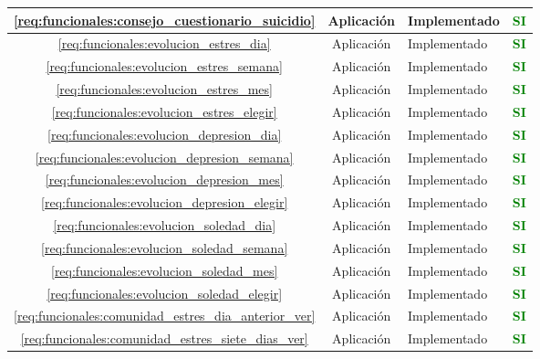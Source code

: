 \begin{xltabular}{\textwidth}{|c|c|X|c|}
        \hline
        \ref{req:funcionales:consejo_cuestionario_suicidio} & Aplicación & Implementado & \textcolor{green}{\textbf{SI}} \\
        \hline
        \ref{req:funcionales:evolucion_estres_dia} & Aplicación & Implementado & \textcolor{green}{\textbf{SI}} \\
        \hline
        \ref{req:funcionales:evolucion_estres_semana} & Aplicación & Implementado & \textcolor{green}{\textbf{SI}} \\
        \hline
        \ref{req:funcionales:evolucion_estres_mes} & Aplicación & Implementado & \textcolor{green}{\textbf{SI}} \\
        \hline
        \ref{req:funcionales:evolucion_estres_elegir} & Aplicación & Implementado & \textcolor{green}{\textbf{SI}} \\
        \hline
        \ref{req:funcionales:evolucion_depresion_dia} & Aplicación & Implementado & \textcolor{green}{\textbf{SI}} \\
        \hline
        \ref{req:funcionales:evolucion_depresion_semana} & Aplicación & Implementado & \textcolor{green}{\textbf{SI}} \\
        \hline
        \ref{req:funcionales:evolucion_depresion_mes} & Aplicación & Implementado & \textcolor{green}{\textbf{SI}} \\
        \hline
        \ref{req:funcionales:evolucion_depresion_elegir} & Aplicación & Implementado & \textcolor{green}{\textbf{SI}} \\
        \hline
        \ref{req:funcionales:evolucion_soledad_dia} & Aplicación & Implementado & \textcolor{green}{\textbf{SI}} \\
        \hline
        \ref{req:funcionales:evolucion_soledad_semana} & Aplicación & Implementado & \textcolor{green}{\textbf{SI}} \\
        \hline
        \ref{req:funcionales:evolucion_soledad_mes} & Aplicación & Implementado & \textcolor{green}{\textbf{SI}} \\
        \hline
        \ref{req:funcionales:evolucion_soledad_elegir} & Aplicación & Implementado & \textcolor{green}{\textbf{SI}} \\
        \hline
        \ref{req:funcionales:comunidad_estres_dia_anterior_ver} & Aplicación & Implementado & \textcolor{green}{\textbf{SI}} \\
        \hline
        \ref{req:funcionales:comunidad_estres_siete_dias_ver} & Aplicación & Implementado & \textcolor{green}{\textbf{SI}} \\

\end{xltabular}
